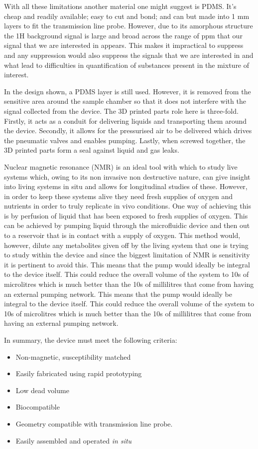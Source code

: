 With all these limitations another material one might suggest is PDMS. It’s cheap and
readily available; easy to cut and bond; and can but made into 1 mm layers to fit the
transmission line probe. However, due to its amorphous structure the 1H background
signal is large and broad across the range of ppm that our signal that we are interested in
appears. This makes it impractical to suppress and any suppression would also suppress the
signals that we are interested in and what lead to difficulties in quantification of
substances present in the mixture of interest.

In the design shown, a PDMS layer is still used. However, it is removed from the
sensitive area around the sample chamber so that it does not interfere with the signal
collected from the device. The 3D printed parts role here is three-fold. Firstly, it acts
as a conduit for delivering liquids and transporting them around the device. Secondly, it
allows for the pressurised air to be delivered which drives the pneumatic valves and
enables pumping. Lastly, when screwed together, the 3D printed parts form a seal against
liquid and gas leaks.

Nuclear magnetic resonance (NMR) is an ideal tool with which to study live systems
which, owing to its non invasive non destructive nature, can give insight into living
systems in situ and allows for longitudinal studies of these. However, in order to
keep these systems alive they need fresh supplies of oxygen and nutrients in order to
truly replicate in vivo conditions. One way of achieving this is by perfusion of
liquid that has been exposed to fresh supplies of oxygen. This can be achieved by
pumping liquid through the microfluidic device and then out to a reservoir that is in
contact with a supply of oxygen. This method would, however, dilute any metabolites
given off by the living system that one is trying to study within the device and
since the biggest limitation of NMR is sensitivity it is pertinent to avoid this. This
means that the pump would ideally be integral to the device itself. This could reduce the
overall volume of the system to 10s of microlitres which is much better than the 10s of
millilitres that come from having an external pumping network. This means that the pump
would ideally be integral to the device itself. This could reduce the overall volume of the
system to 10s of microlitres which is much better than the 10s of millilitres that come
from having an external pumping network.

In summary, the device must meet the following criteria:
\begin{itemize}
  \item Non-magnetic, susceptibility matched
  \item Easily fabricated using rapid prototyping
  \item Low dead volume
  \item Biocompatible
  \item Geometry compatible with transmission line probe.
  \item Easily assembled and operated \textit{in situ}
\end{itemize}

